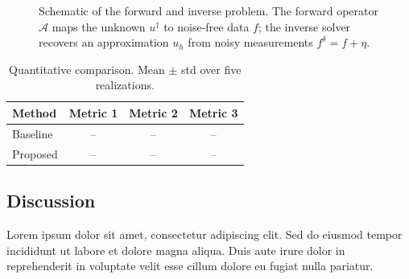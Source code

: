 \begin{figure}[!htb]
    \centering
    \caption{Schematic of the forward and inverse problem. The forward operator
             $\mathcal{A}$ maps the unknown $u^\dagger$ to noise-free data $f$;
             the inverse solver recovers an approximation $u_h$ from noisy
             measurements $f^\delta = f + \eta$.}
    \label{fig:results}
\end{figure}

\begin{table}[!htb]
    \centering
    \caption{Quantitative comparison. Mean $\pm$ std over five realizations.}
    \label{tab:results}
    \begin{tabular}{lccc}
        \toprule
        Method   & Metric 1 & Metric 2 & Metric 3 \\
        \midrule
        Baseline & -- & -- & -- \\
        Proposed & -- & -- & -- \\
        \bottomrule
    \end{tabular}
\end{table}

\subsection{Discussion}\label{ssec:discussion}

Lorem ipsum dolor sit amet, consectetur adipiscing elit. Sed do eiusmod tempor
incididunt ut labore et dolore magna aliqua. Duis aute irure dolor in
reprehenderit in voluptate velit esse cillum dolore eu fugiat nulla pariatur.
